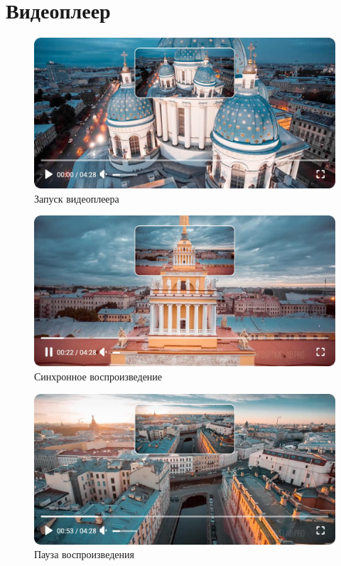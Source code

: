 	\section{Видеоплеер}

	\begin{figure}[ht!]
		\center
		\includegraphics [scale=0.37] {my_folder/images//player_start}
		\caption{Запуск видеоплеера} 
		\label{fig:player_start}  
	\end{figure}

	\begin{figure}[ht!]
		\center
		\includegraphics [scale=0.37] {my_folder/images//player_playing}
		\caption{Синхронное воспроизведение} 
		\label{fig:player_playing}
	\end{figure}

	\begin{figure}[ht!]
		\center
		\includegraphics [scale=0.37] {my_folder/images//player_pause}
		\caption{Пауза воспроизведения} 
		\label{fig:player_pause}
	\end{figure}

